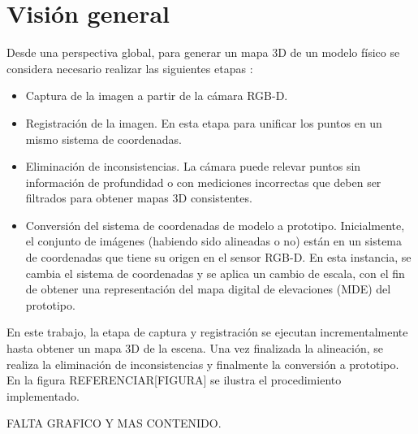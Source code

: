 \chapter{Visión general}

Desde una perspectiva global, para generar un mapa 3D de un modelo físico se considera necesario realizar las siguientes etapas :
\begin{itemize}

\item Captura de la imagen a partir de la cámara RGB-D.

\item Registración de la imagen. En esta etapa para unificar los puntos en un mismo sistema de coordenadas.

\item Eliminación de inconsistencias. La cámara puede relevar puntos sin información de profundidad o con mediciones incorrectas que deben ser filtrados para obtener mapas 3D consistentes. 

\item Conversión del sistema de coordenadas de modelo a prototipo. Inicialmente, el conjunto de imágenes (habiendo sido alineadas o no) están en un sistema de coordenadas que tiene su origen en el sensor RGB-D. En esta instancia, se cambia el sistema de coordenadas y se aplica un cambio de escala, con el fin de obtener una representación del mapa digital de elevaciones (MDE) del prototipo.

\end{itemize}

En este trabajo, la etapa de captura y registración se ejecutan incrementalmente hasta obtener un mapa 3D de la escena. Una vez finalizada la alineación, se realiza la eliminación de inconsistencias y finalmente la conversión a prototipo. En la figura REFERENCIAR[FIGURA] se ilustra el procedimiento implementado.

FALTA GRAFICO Y MAS CONTENIDO.


